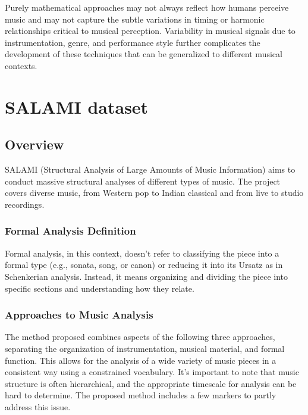 Purely mathematical approaches may not always reflect how humans perceive music and may not capture the subtle variations in timing or harmonic relationships critical to musical perception. Variability in musical signals due to instrumentation, genre, and performance style further complicates the development of these techniques that can be generalized to different musical contexts.




\section{SALAMI dataset}
\subsection{Overview}

SALAMI (Structural Analysis of Large Amounts of Music Information) \cite{Smith2011DESIGNANNOTATIONS} aims to conduct massive structural analyses of different types of music. The project covers diverse music, from Western pop to Indian classical and from live to studio recordings.

\subsubsection{Formal Analysis Definition}
Formal analysis, in this context, doesn't refer to classifying the piece into a formal type (e.g., sonata, song, or canon) or reducing it into its Ursatz as in Schenkerian analysis. Instead, it means organizing and dividing the piece into specific sections and understanding how they relate.


\subsubsection{Approaches to Music Analysis}

The method proposed combines aspects of the following three approaches, separating the organization of instrumentation, musical material, and formal function. This allows for the analysis of a wide variety of music pieces in a consistent way using a constrained vocabulary. It's important to note that music structure is often hierarchical, and the appropriate timescale for analysis can be hard to determine. The proposed method includes a few markers to partly address this issue.

